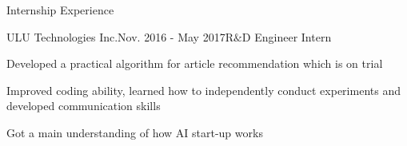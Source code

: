 \documentclass{resume} %
\begin{document}
\begin{comment}
\begin{rSubsection}{Large-Scale WEB Vulnerability Detection by Supervised Learning}{Oct. 2014 - June. 2015}{}{}
\item Developed an algorithm to detect malicious URLs from Shanghai Telecomm 120 gigabytes web log.
\item Extracted information including Whois, IP connection and URLs to form feature vectors.
\item Trained multiclass-SVM to classify benign or malicious URLs based on labels obtained from Google Safe Browsing API and achieved 86\% accuracy.
\end{rSubsection}

\begin{rSubsection}{Vehicle WLAN Based Car Sharing Platform}{Mar. 2014 - Dec. 2014}{}{}
\item Designed a car sharing system in 3-person team with vehicle based hardware, Android APP and web platform to improve efficiency of car rental service. 
\item Enrolled in Fourth Shanghai College Innovation \& Entrepreneurship Forum (3/300 selected from SJTU).
\item Patented in China : CN104836860 A
\end{rSubsection}

\end{rSection}
\vspace{0.5em}
\end{comment}
\begin{rSection}{Internship Experience}
\begin{rSubsection}{ULU Technologies Inc.}{Nov. 2016 - May 2017}{R$\&$D  Engineer Intern}{}
\item Developed a practical algorithm for article recommendation which is on trial
\item Improved coding ability, learned how to independently conduct experiments and developed communication skills
\item Got a main understanding of how AI start-up works
\end{rSubsection}
\end{rSection}
\end{document}
